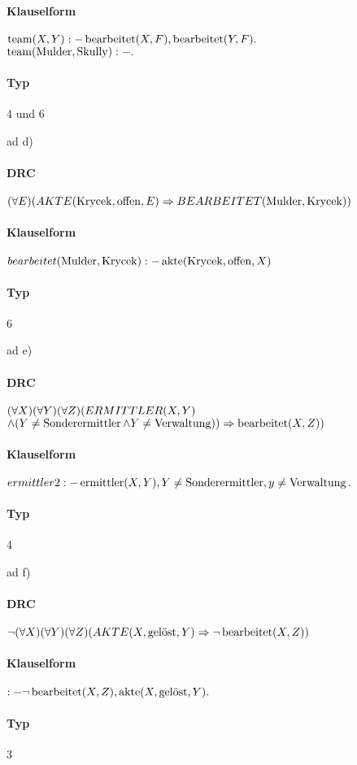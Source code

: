 \documentclass[12pt,a4paper]{amsart}
\begin{document}
\paragraph{Klauselform}
$\operatorname{team}(X,Y) :- \operatorname{bearbeitet}(X, F), \operatorname{bearbeitet}(Y, F).$ \\
$\operatorname{team}(\operatorname{Mulder}, \operatorname{Skully}) :-.$

\paragraph{Typ}
4 und 6 \\
\bigskip


ad d) \\

\paragraph{DRC}
$(\forall E)(AKTE(\operatorname{Krycek}, \operatorname{offen}, E) \Rightarrow BEARBEITET(\operatorname{Mulder}, \operatorname{Krycek}))$ \\
\paragraph{Klauselform}
$bearbeitet(\operatorname{Mulder}, \operatorname{Krycek}) :- \operatorname{akte}(\operatorname{Krycek}, \operatorname{offen}, X)$\\
\paragraph{Typ}
6 \\
\bigskip


ad e) \\

\paragraph{DRC}

$(\forall X)(\forall Y)(\forall Z)(ERMITTLER(X, Y) \\$
$\wedge (Y \neq \operatorname{Sonderermittler} \wedge Y \neq \operatorname{Verwaltung})) \Rightarrow \operatorname{bearbeitet}(X,Z))$

\paragraph{Klauselform}
$ermittler2 :- \operatorname{ermittler}(X,Y), Y \neq \operatorname{Sonderermittler}, y \neq \operatorname{Verwaltung}.$
\paragraph{Typ}
4 \\

\bigskip

ad f) \\

\paragraph{DRC}
$\lnot (\forall X)(\forall Y)(\forall Z)(AKTE(X, \operatorname{gel\ddot{o}st}, Y) \Rightarrow \lnot \operatorname{bearbeitet}(X, Z))$

\paragraph{Klauselform}
$:- \lnot \operatorname{bearbeitet}(X, Z), \operatorname{akte}(X, \operatorname{gel\ddot{o}st}, Y).$
\paragraph{Typ}
3 \\
\end{document}
